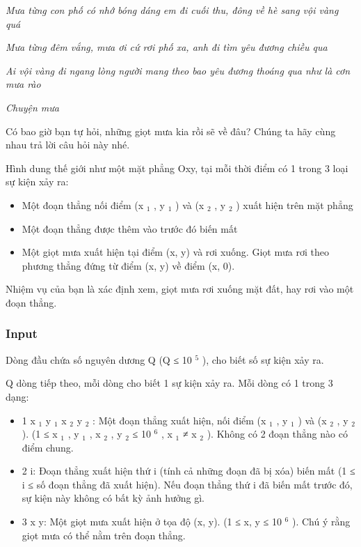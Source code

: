 

\emph{Mưa từng con phố có nhớ bóng dáng em đi cuối thu, đông về hè sang vội vàng quá }

\emph{Mưa từng đêm vắng, mưa ơi cứ rơi phố xa, anh đi tìm yêu đương chiều qua }

\emph{Ai vội vàng đi ngang lòng người mang theo bao yêu đương thoáng qua như là cơn mưa rào }

\emph{Chuyện mưa }

Có bao giờ bạn tự hỏi, những giọt mưa kia rồi sẽ về đâu? Chúng ta hãy cùng nhau trả lời câu hỏi này nhé.

Hình dung thế giới như một mặt phẳng Oxy, tại mỗi thời điểm có 1 trong 3 loại sự kiện xảy ra:
\begin{itemize}
	\item Một đoạn thẳng nối điểm (x $_ 1 $ , y $_ 1 $ ) và (x $_ 2 $ , y $_ 2 $ ) xuất hiện trên mặt phẳng
	\item Một đoạn thẳng được thêm vào trước đó biến mất
	\item Một giọt mưa xuất hiện tại điểm (x, y) và rơi xuống. Giọt mưa rơi theo phương thẳng đứng từ điểm (x, y) về điểm (x, 0).
\end{itemize}

Nhiệm vụ của bạn là xác định xem, giọt mưa rơi xuống mặt đất, hay rơi vào một đoạn thẳng.

\subsubsection{Input}

Dòng đầu chứa số nguyên dương Q (Q ≤ 10 $^ 5 $ ), cho biết số sự kiện xảy ra.

Q dòng tiếp theo, mỗi dòng cho biết 1 sự kiện xảy ra. Mỗi dòng có 1 trong 3 dạng:
\begin{itemize}
	\item 1 x $_ 1 $ y $_ 1 $ x $_ 2 $ y $_ 2 $ : Một đoạn thẳng xuất hiện, nối điểm (x $_ 1 $ , y $_ 1 $ ) và (x $_ 2 $ , y $_ 2 $ ). (1 ≤ x $_ 1 $ , y $_ 1 $ , x $_ 2 $ , y $_ 2 $ ≤ 10 $^ 6 $ , x $_ 1 $ ≠ x $_ 2 $ ). Không có 2 đoạn thẳng nào có điểm chung.
	\item 2 i: Đoạn thẳng xuất hiện thứ i (tính cả những đoạn đã bị xóa) biến mất (1 ≤ i ≤ số đoạn thẳng đã xuất hiện). Nếu đoạn thẳng thứ i đã biến mất trước đó, sự kiện này không có bất kỳ ảnh hưởng gì.
	\item 3 x y: Một giọt mưa xuất hiện ở tọa độ (x, y). (1 ≤ x, y ≤ 10 $^ 6 $ ). Chú ý rằng giọt mưa có thể nằm trên đoạn thẳng.
\end{itemize}

